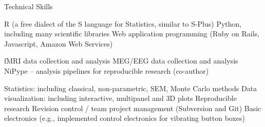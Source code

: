 \begin{rubric}{Technical Skills}

\entry* R (a free dialect of the S language for Statistics, similar to S-Plus)
\entry* Python, including many scientific libraries
\entry* Web application programming (Ruby on Rails, Javascript, Amazon Web
Services)

\entry* fMRI data collection and analysis
\entry* MEG/EEG data collection and analysis
\entry* NiPype -- analysis pipelines for reproducible research (co-author)

\entry* Statistics: including classical, non-parametric, SEM, Monte Carlo methods
\entry* Data visualization: including interactive, multipanel and 3D plots
\entry* Reproducible research
\entry* Revision control / team project management (Subversion and Git)
\entry* Basic electronics (e.g., implemented control electronics for vibrating button
boxes)

\end{rubric}

